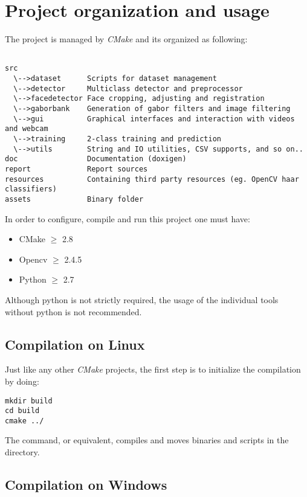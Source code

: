 \section{Project organization and usage}

The project is managed by \emph{CMake} and its organized as following:

\begin{verbatim}

src
  \-->dataset      Scripts for dataset management
  \-->detector     Multiclass detector and preprocessor
  \-->facedetector Face cropping, adjusting and registration
  \-->gaborbank    Generation of gabor filters and image filtering
  \-->gui          Graphical interfaces and interaction with videos and webcam
  \-->training     2-class training and prediction
  \-->utils        String and IO utilities, CSV supports, and so on..
doc                Documentation (doxigen)
report             Report sources
resources          Containing third party resources (eg. OpenCV haar classifiers)
assets             Binary folder

\end{verbatim}

In order to configure, compile and run this project one must have:

\begin{itemize}
  \item CMake $\ge$ 2.8
  \item Opencv $\ge$ 2.4.5
  \item Python $\ge$ 2.7
\end{itemize}

Although python is not strictly required, the usage of the individual tools
without python is not recommended.

\subsection{Compilation on Linux}

Just like any other \emph{CMake} projects, the first step is to initialize the
compilation by doing:

\begin{verbatim}
mkdir build
cd build
cmake ../
\end{verbatim}

The  command, or equivalent, compiles and moves binaries and
scripts in the  directory.

\subsection{Compilation on Windows}


